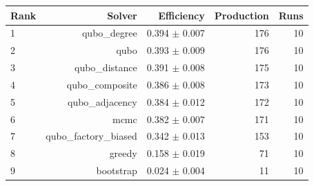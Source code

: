 \begin{tabular}{lrrrr}
\toprule
Rank & Solver & Efficiency & Production & Runs \\
\midrule
1 & qubo\_degree & 0.394 $\pm$ 0.007 & 176 & 10 \\
2 & qubo & 0.393 $\pm$ 0.009 & 176 & 10 \\
3 & qubo\_distance & 0.391 $\pm$ 0.008 & 175 & 10 \\
4 & qubo\_composite & 0.386 $\pm$ 0.008 & 173 & 10 \\
5 & qubo\_adjacency & 0.384 $\pm$ 0.012 & 172 & 10 \\
6 & mcmc & 0.382 $\pm$ 0.007 & 171 & 10 \\
7 & qubo\_factory\_biased & 0.342 $\pm$ 0.013 & 153 & 10 \\
8 & greedy & 0.158 $\pm$ 0.019 & 71 & 10 \\
9 & bootstrap & 0.024 $\pm$ 0.004 & 11 & 10 \\
\bottomrule
\end{tabular}
